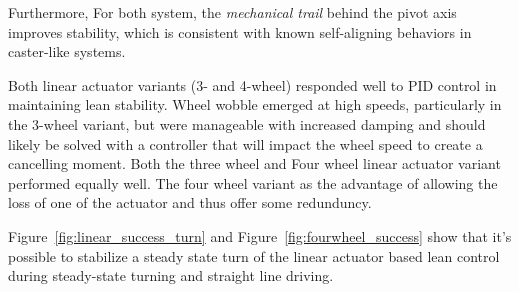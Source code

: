 Furthermore, For both system, the \textit{mechanical trail} behind the pivot axis improves stability, which is consistent with known self-aligning behaviors in caster-like systems.

Both linear actuator variants (3- and 4-wheel) responded well to PID control in maintaining lean stability. Wheel wobble emerged at high speeds, particularly in the 3-wheel variant, but were manageable with increased damping and should likely be solved with a controller that will impact the wheel speed to create a cancelling moment. Both the three wheel and Four wheel linear actuator variant performed equally well. The four wheel variant as the advantage of allowing the loss of one of the actuator and thus offer some redunduncy. 

Figure~\ref{fig:linear_success_turn} and Figure~\ref{fig:fourwheel_success} show that it's possible to stabilize a steady state turn of the linear actuator based lean control during steady-state turning and straight line driving.

